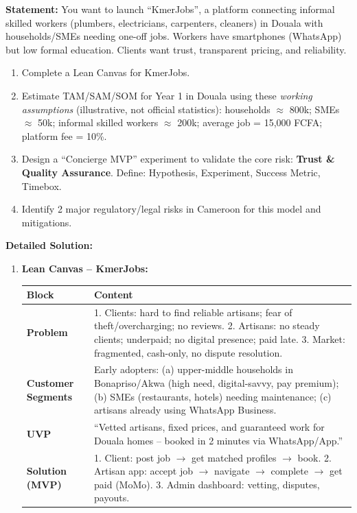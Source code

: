 \documentclass[11pt]{article}
\begin{document}
\begin{exoresolu}
\textbf{Statement:} You want to launch ``KmerJobs'', a platform connecting informal skilled workers (plumbers, electricians, carpenters, cleaners) in Douala with households/SMEs needing one-off jobs. Workers have smartphones (WhatsApp) but low formal education. Clients want trust, transparent pricing, and reliability.
\begin{enumerate}
    \item Complete a Lean Canvas for KmerJobs.
    \item Estimate TAM/SAM/SOM for Year 1 in Douala using these \emph{working assumptions} (illustrative, not official statistics): households $\approx$ 800k; SMEs $\approx$ 50k; informal skilled workers $\approx$ 200k; average job = 15,000 FCFA; platform fee = 10\%.
    \item Design a ``Concierge MVP'' experiment to validate the core risk: \textbf{Trust \& Quality Assurance}. Define: Hypothesis, Experiment, Success Metric, Timebox.
    \item Identify 2 major regulatory/legal risks in Cameroon for this model and mitigations.
\end{enumerate}
\tcblower
\textbf{Detailed Solution:}
\begin{enumerate}
    \item \textbf{Lean Canvas -- KmerJobs:}
    \begin{center}
    \begin{tabularx}{\linewidth}{|l|X|}\hline
    \rowcolor{popblueL} \textbf{Block} & \textbf{Content} \\ \hline
    \textbf{Problem} & 1. Clients: hard to find reliable artisans; fear of theft/overcharging; no reviews. 2. Artisans: no steady clients; underpaid; no digital presence; paid late. 3. Market: fragmented, cash-only, no dispute resolution. \\ \hline
    \textbf{Customer Segments} & Early adopters: (a) upper-middle households in Bonapriso/Akwa (high need, digital-savvy, pay premium); (b) SMEs (restaurants, hotels) needing maintenance; (c) artisans already using WhatsApp Business. \\ \hline
    \textbf{UVP} & ``Vetted artisans, fixed prices, and guaranteed work for Douala homes -- booked in 2 minutes via WhatsApp/App.'' \\ \hline
    \textbf{Solution (MVP)} & 1. Client: post job $\to$ get matched profiles $\to$ book. 2. Artisan app: accept job $\to$ navigate $\to$ complete $\to$ get paid (MoMo). 3. Admin dashboard: vetting, disputes, payouts. \\ \hline

\end{tabularx}
\end{center}
\end{enumerate}
\end{exoresolu}
\end{document}
